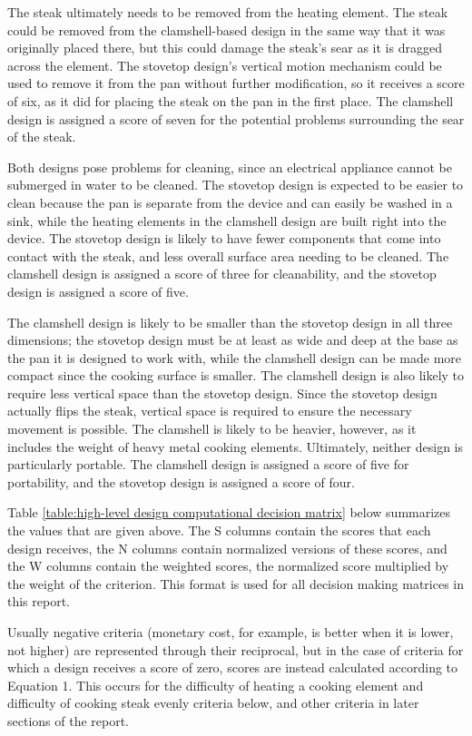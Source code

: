 \documentclass[11pt]{article}
\begin{document}
The steak ultimately needs to be removed from the heating element.
The steak could be removed from the clamshell-based design in the same way that it was originally placed there, but this could damage the steak’s sear as it is dragged across the element.
The stovetop design’s vertical motion mechanism could be used to remove it from the pan without further modification, so it receives a score of six, as it did for placing the steak on the pan in the first place.
The clamshell design is assigned a score of seven for the potential problems surrounding the sear of the steak.

Both designs pose problems for cleaning, since an electrical appliance cannot be submerged in water to be cleaned.
The stovetop design is expected to be easier to clean because the pan is separate from the device and can easily be washed in a sink, while the heating elements in the clamshell design are built right into the device.
The stovetop design is likely to have fewer components that come into contact with the steak, and less overall surface area needing to be cleaned.
The clamshell design is assigned a score of three for cleanability, and the stovetop design is assigned a score of five.

The clamshell design is likely to be smaller than the stovetop design in all three dimensions; the stovetop design must be at least as wide and deep at the base as the pan it is designed to work with, while the clamshell design can be made more compact since the cooking surface is smaller.
The clamshell design is also likely to require less vertical space than the stovetop design.
Since the stovetop design actually flips the steak, vertical space is required to ensure the necessary movement is possible.
The clamshell is likely to be heavier, however, as it includes the weight of heavy metal cooking elements.
Ultimately, neither design is particularly portable.
The clamshell design is assigned a score of five for portability, and the stovetop design is assigned a score of four.

Table \ref{table:high-level design computational decision matrix} below summarizes the values that are given above.
The S columns contain the scores that each design receives, the N columns contain normalized versions of these scores, and the W columns contain the weighted scores, the normalized score multiplied by the weight of the criterion.
This format is used for all decision making matrices in this report.

Usually negative criteria (monetary cost, for example, is better when it is lower, not higher) are represented through their reciprocal, but in the case of criteria for which a design receives a score of zero, scores are instead calculated according to Equation 1.
This occurs for the difficulty of heating a cooking element and difficulty of cooking steak evenly criteria below, and other criteria in later sections of the report.
\end{document}
